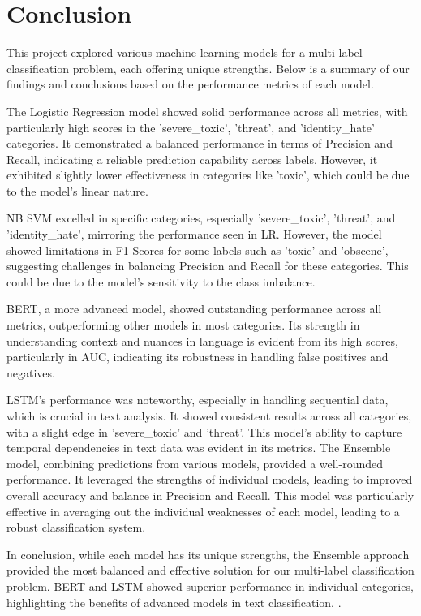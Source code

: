 \section{Conclusion}

This project explored various machine learning models for a multi-label classification problem, each offering unique strengths. Below is a summary of our findings and conclusions based on the performance metrics of each model.

The Logistic Regression model showed solid performance across all metrics, with particularly high scores in the 'severe\_toxic', 'threat', and 'identity\_hate' categories. It demonstrated a balanced performance in terms of Precision and Recall, indicating a reliable prediction capability across labels. However, it exhibited slightly lower effectiveness in categories like 'toxic', which could be due to the model's linear nature.

NB SVM excelled in specific categories, especially 'severe\_toxic', 'threat', and 'identity\_hate', mirroring the performance seen in LR. However, the model showed limitations in F1 Scores for some labels such as 'toxic' and 'obscene', suggesting challenges in balancing Precision and Recall for these categories. This could be due to the model's sensitivity to the class imbalance.

BERT, a more advanced model, showed outstanding performance across all metrics, outperforming other models in most categories. Its strength in understanding context and nuances in language is evident from its high scores, particularly in AUC, indicating its robustness in handling false positives and negatives.

LSTM's performance was noteworthy, especially in handling sequential data, which is crucial in text analysis. It showed consistent results across all categories, with a slight edge in 'severe\_toxic' and 'threat'. This model's ability to capture temporal dependencies in text data was evident in its metrics.
The Ensemble model, combining predictions from various models, provided a well-rounded performance. It leveraged the strengths of individual models, leading to improved overall accuracy and balance in Precision and Recall. This model was particularly effective in averaging out the individual weaknesses of each model, leading to a robust classification system.

In conclusion, while each model has its unique strengths, the Ensemble approach provided the most balanced and effective solution for our multi-label classification problem. BERT and LSTM showed superior performance in individual categories, highlighting the benefits of advanced models in text classification. .